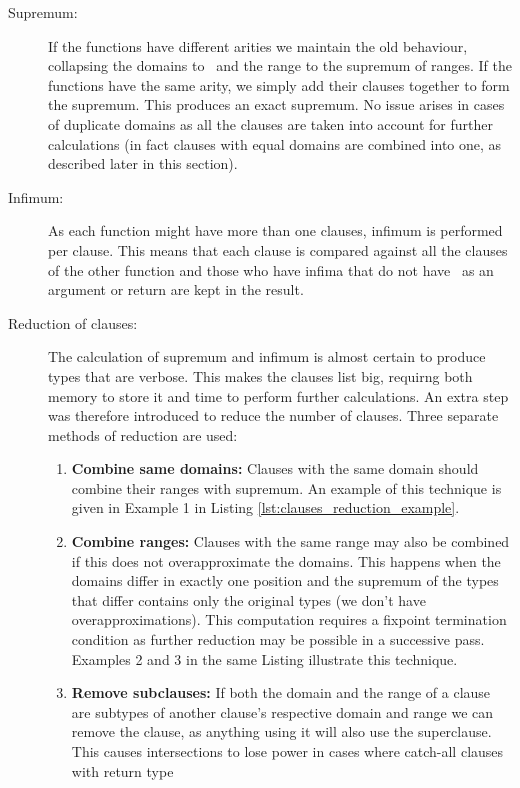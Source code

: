 \begin{description}
\item[Supremum:] If the functions have different arities we maintain
  the old behaviour, collapsing the domains to \any\ and the range to
  the supremum of ranges. If the functions have the same arity, we
  simply add their clauses together to form the supremum. This
  produces an exact supremum. No issue arises in cases of duplicate
  domains as all the clauses are taken into account for further
  calculations (in fact clauses with equal domains are combined into
  one, as described later in this section).
\item[Infimum:] As each function might have more than one clauses,
  infimum is performed per clause. This means that each clause is
  compared against all the clauses of the other function and those who
  have infima that do not have \none\ as an argument or return are
  kept in the result.
\item[Reduction of clauses:] The calculation of supremum and infimum
  is almost certain to produce types that are verbose. This makes the
  clauses list big, requirng both memory to store it and time to
  perform further calculations. An extra step was therefore introduced
  to reduce the number of clauses. Three separate methods of reduction
  are used:
  \begin{enumerate}
    \item \textbf{Combine same domains:} Clauses with the same domain
      should combine their ranges with supremum. An example of this
      technique is given in Example 1 in Listing
      \ref{lst:clauses_reduction_example}.
    \item \textbf{Combine ranges:} Clauses with the same range may
      also be combined if this does not overapproximate the
      domains. This happens when the domains differ in exactly one
      position and the supremum of the types that differ contains only
      the original types (we don't have overapproximations). This
      computation requires a fixpoint termination condition as further
      reduction may be possible in a successive pass. Examples 2 and 3
      in the same Listing illustrate this technique.
    \item \textbf{Remove subclauses:} If both the domain and the range
      of a clause are subtypes of another clause's respective domain
      and range we can remove the clause, as anything using it will
      also use the superclause. This causes intersections to lose
      power in cases where catch-all clauses with return type

\end{enumerate}
\end{description}
